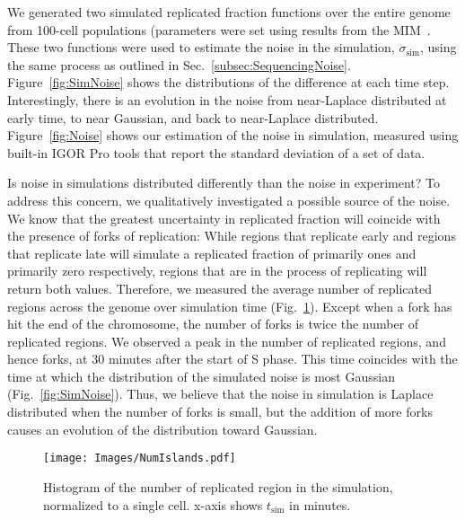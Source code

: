 		We generated two simulated replicated fraction functions over the entire genome from 100-cell populations (parameters were set using results from the MIM~\cite{ScottsPaper}.
		These two functions were used to estimate the noise in the simulation, $\sigma_\text{sim}$, using the same process as outlined in Sec.~\ref{subsec:SequencingNoise}.
		Figure~\ref{fig:SimNoise} shows the distributions of the difference at each time step.
		Interestingly, there is an evolution in the noise from near-Laplace distributed at early time, to near Gaussian, and back to near-Laplace distributed.
		Figure~\ref{fig:Noise} shows our estimation of the noise in simulation, measured using built-in IGOR Pro tools that report the standard deviation of a set of data.
		
		Is  noise in simulations distributed differently than the noise in experiment?
		To address this concern, we qualitatively investigated a possible source of the noise.
		We know that the greatest uncertainty in replicated fraction will coincide with the presence of forks of replication:
		While regions that replicate early and regions that replicate late will simulate a replicated fraction of primarily ones and primarily zero respectively, regions that are in the process of replicating will return both values.
		Therefore, we measured  the average number of replicated regions across the genome over simulation time (Fig.~\ref{fig:NumberIslands}).
		Except when a fork has hit the end of the chromosome, the number of forks is twice the number of replicated regions.
		We observed a peak in the number of replicated regions, and hence forks, at 30 minutes after the start of S phase.
		This time coincides with the time at which the distribution of the simulated noise is most Gaussian (Fig.~\ref{fig:SimNoise}).
		Thus, we believe that the noise in simulation is Laplace distributed when the number of forks is small, but the addition of more forks causes an evolution of the distribution toward Gaussian.
		
		\begin{figure}[tbh]
			\begin{center}
				\texttt{[image: Images/NumIslands.pdf]}
			\end{center}
			\caption[Number of Replicated Regions in Simulation]{\label{fig:NumberIslands}
				Histogram of the number of replicated region in the simulation, normalized to a single cell.
				x-axis shows $t_\text{sim}$ in minutes.
			}
		\end{figure}
		
